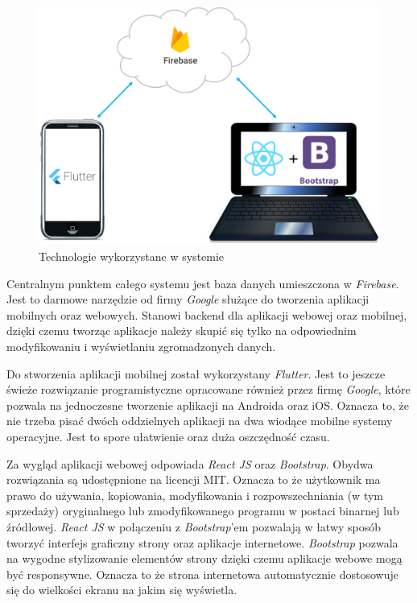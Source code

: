\documentclass[12pt]{article}
\begin{document}
\begin{figure}[H]
	\centering
		\includegraphics[scale=0.52]{technologie.png}
	\caption{Technologie wykorzystane w systemie}
	\label{technologie}
\end{figure}

Centralnym punktem całego systemu jest baza danych umieszczona w \textit{Firebase}. Jest to darmowe narzędzie od firmy \textit{Google} służące do tworzenia aplikacji mobilnych oraz webowych. Stanowi backend dla aplikacji webowej oraz mobilnej, dzięki czemu tworząc aplikacje należy skupić się tylko na odpowiednim modyfikowaniu i wyświetlaniu zgromadzonych danych.

Do stworzenia aplikacji mobilnej został wykorzystany \textit{Flutter}. Jest to jeszcze świeże rozwiązanie programistyczne opracowane również przez firmę \textit{Google}, które pozwala na jednoczesne tworzenie aplikacji na Androida oraz iOS. Oznacza to, że nie trzeba pisać dwóch oddzielnych aplikacji na dwa wiodące mobilne systemy operacyjne. Jest to spore ułatwienie oraz duża oszczędność czasu.

Za wygląd aplikacji webowej odpowiada \textit{React JS} oraz \textit{Bootstrap}. Obydwa rozwiązania są udostępnione na licencji MIT. Oznacza to że użytkownik ma prawo do używania, kopiowania, modyfikowania i rozpowszechniania (w tym sprzedaży) oryginalnego lub zmodyfikowanego programu w postaci binarnej lub źródłowej. \textit{React JS} w połączeniu z \textit{Bootstrap}'em pozwalają w łatwy sposób tworzyć interfejs graficzny strony oraz aplikacje internetowe. \textit{Bootstrap} pozwala na wygodne stylizowanie elementów strony dzięki czemu aplikacje webowe mogą być responsywne. Oznacza to że strona internetowa automatycznie dostosowuje się do wielkości ekranu na jakim się wyświetla. 
\end{document}
